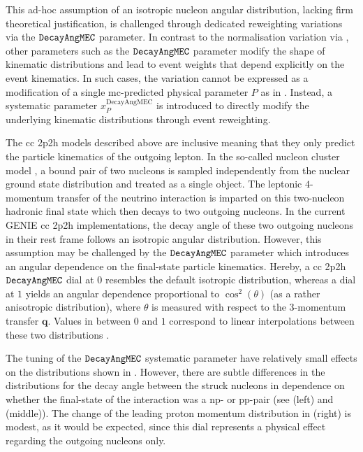 %
This ad-hoc assumption of an isotropic nucleon angular distribution, lacking firm theoretical justification, is challenged through dedicated reweighting variations via the $\verb!DecayAngMEC!$ parameter. In contrast to the normalisation variation via , other parameters such as the $\verb!DecayAngMEC!$ parameter modify the shape of kinematic distributions and lead to event weights that depend explicitly on the event kinematics. In such cases, the variation cannot be expressed as a modification of a single \acrshort{mc}-predicted physical parameter $P$ as in . Instead, a systematic parameter $x^\text{DecayAngMEC}_P$ is introduced to directly modify the underlying kinematic distributions through event reweighting.






The \acrshort{cc} \acrshort{2p2h} models described above are inclusive meaning that they only predict the particle kinematics of the outgoing lepton. In the so-called nucleon cluster model \cite{10.1063/1.4919465}, a bound pair of two nucleons is sampled independently from the nuclear ground state distribution and treated as a single object. The leptonic $4$-momentum transfer of the neutrino interaction is imparted on this two-nucleon hadronic final state which then decays to two outgoing nucleons. In the current GENIE \acrshort{cc} \acrshort{2p2h} implementations, the decay angle of these two outgoing nucleons in their rest frame follows an isotropic angular distribution. However, this assumption may be challenged by the $\verb!DecayAngMEC!$ parameter which introduces an angular dependence on the final-state particle kinematics. Hereby, a \acrshort{cc} \acrshort{2p2h} $\verb!DecayAngMEC!$ dial at $0$ resembles the default isotropic distribution, whereas a dial at $1$ yields an angular dependence proportional to $\cos^2(\theta)$ (as a rather anisotropic distribution), where $\theta$ is measured with respect to the $3$-momentum transfer $\mathbf{q}$. Values in between $0$ and $1$ correspond to linear interpolations between these two distributions \cite{PhysRevD.105.072001}.


The tuning of the $\verb!DecayAngMEC!$ %
systematic parameter have relatively small effects on the distributions shown in . However, there are subtle differences in the distributions for the decay angle between the struck nucleons in dependence on whether the final-state of the interaction was a np- or pp-pair (see  (left) and (middle)). The change of the leading proton momentum distribution in  (right) is modest, as it would be expected, since this dial represents a physical effect regarding the outgoing nucleons only.  %

